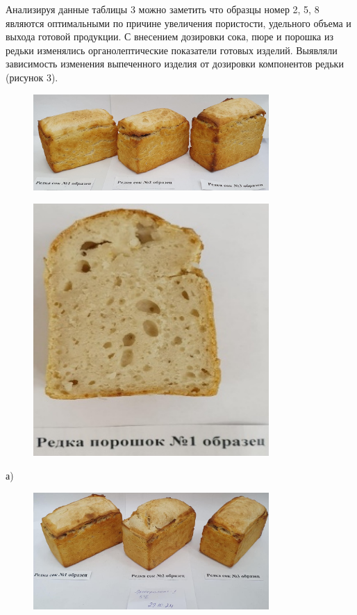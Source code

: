 Анализируя данные таблицы 3 можно заметить что образцы номер 2, 5, 8
являются оптимальными по причине увеличения пористости, удельного объема
и выхода готовой продукции. С внесением дозировки сока, пюре и порошка
из редьки изменялись органолептические показатели готовых изделий.
Выявляли зависимость изменения выпеченного изделия от дозировки
компонентов редьки (рисунок 3).

\begin{figure}[H]
	\centering
	\includegraphics[width=0.8\textwidth]{media/pish/image61}
	\caption*{}
\end{figure}
\begin{figure}[H]
	\centering
	\includegraphics[width=0.8\textwidth]{media/pish/image62}
	\caption*{}
\end{figure}
а)
\begin{figure}[H]
	\centering
	\includegraphics[width=0.8\textwidth]{media/pish/image63}
	\caption*{}
\end{figure}
